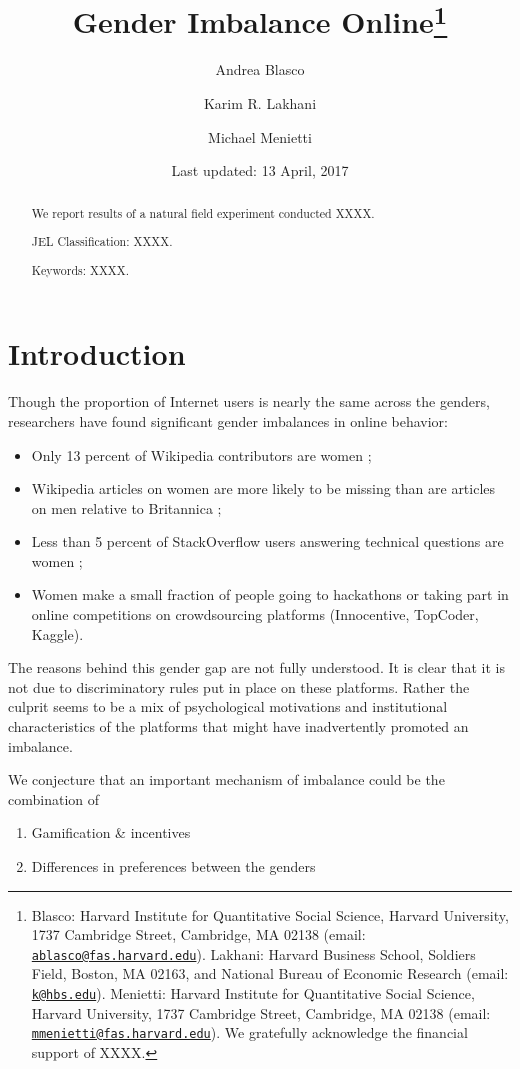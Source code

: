 \documentclass[12pt, titlepage]{article}
\institute{}
\title{Gender Imbalance Online\thanks{Blasco: Harvard Institute for Quantitative Social Science, Harvard
University, 1737 Cambridge Street, Cambridge, MA 02138 (email:
\href{mailto:ablasco@fas.harvard.edu}{\nolinkurl{ablasco@fas.harvard.edu}}).
Lakhani: Harvard Business School, Soldiers Field, Boston, MA 02163, and
National Bureau of Economic Research (email:
\href{mailto:k@hbs.edu}{\nolinkurl{k@hbs.edu}}). Menietti: Harvard
Institute for Quantitative Social Science, Harvard University, 1737
Cambridge Street, Cambridge, MA 02138 (email:
\href{mailto:mmenietti@fas.harvard.edu}{\nolinkurl{mmenietti@fas.harvard.edu}}).
We gratefully acknowledge the financial support of XXXX.}}
\author{Andrea Blasco \and Karim R. Lakhani \and Michael Menietti}
\date{Last updated: 13 April, 2017}
\providecommand{\tightlist}{%
  \setlength{\itemsep}{0pt}\setlength{\parskip}{0pt}}
\begin{document}
\maketitle
\begin{abstract}
We report results of a natural field experiment conducted XXXX.

\smallskip\noindent 
JEL Classification: XXXX.

\smallskip\noindent 
Keywords: XXXX.
\end{abstract}


\clearpage

\section{Introduction}\label{introduction}

Though the proportion of Internet users is nearly the same across the
genders, researchers have found significant gender imbalances in online
behavior:

\begin{itemize}
\tightlist
\item
  Only 13 percent of Wikipedia contributors are women
  \citep{hill2013wikipedia};
\item
  Wikipedia articles on women are more likely to be missing than are
  articles on men relative to Britannica \citep{reagle2011gender};
\item
  Less than 5 percent of StackOverflow users answering technical
  questions are women \citep{vasilescu2012gender};
\item
  Women make a small fraction of people going to hackathons or taking
  part in online competitions on crowdsourcing platforms (Innocentive,
  TopCoder, Kaggle).
\end{itemize}

The reasons behind this gender gap are not fully understood. It is clear
that it is not due to discriminatory rules put in place on these
platforms. Rather the culprit seems to be a mix of psychological
motivations and institutional characteristics of the platforms that
might have inadvertently promoted an imbalance.

We conjecture that an important mechanism of imbalance could be the
combination of

\begin{enumerate}
\def\labelenumi{\arabic{enumi}.}
\tightlist
\item
  Gamification \& incentives
\item
  Differences in preferences between the genders
\end{enumerate}
\end{document}
